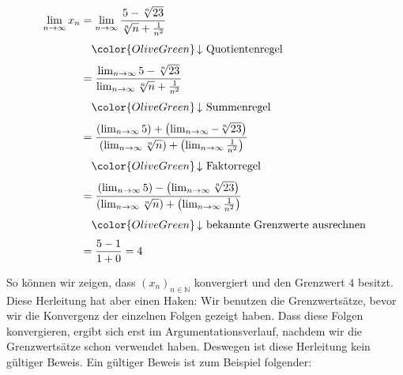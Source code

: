 \documentclass[fontsize=9pt,
               parskip=half-,
               DIV=14,
               listof=chapterentry,
               tocflat]{scrbook}
\begin{document}
\begin{align*}
\lim _{n\rightarrow \infty }x_{n}&=\lim _{n\rightarrow \infty }{\frac {5-{\sqrt[{n}]{23}}}{{\sqrt[{n}]{n}}+{\tfrac {1}{n^{2}}}}}\\[0.3em]&\quad {\color {OliveGreen}\left\downarrow \ {\text{Quotientenregel}}\right.}\\[0.3em]&={\frac {\lim _{n\rightarrow \infty }5-{\sqrt[{n}]{23}}}{\lim _{n\rightarrow \infty }{\sqrt[{n}]{n}}+{\tfrac {1}{n^{2}}}}}\\[0.3em]&\quad {\color {OliveGreen}\left\downarrow \ {\text{Summenregel}}\right.}\\[0.3em]&={\frac {\left(\lim _{n\rightarrow \infty }5\right)+\left(\lim _{n\rightarrow \infty }-{\sqrt[{n}]{23}}\right)}{\left(\lim _{n\rightarrow \infty }{\sqrt[{n}]{n}}\right)+\left(\lim _{n\rightarrow \infty }{\tfrac {1}{n^{2}}}\right)}}\\[0.3em]&\quad {\color {OliveGreen}\left\downarrow \ {\text{Faktorregel}}\right.}\\[0.3em]&={\frac {\left(\lim _{n\rightarrow \infty }5\right)-\left(\lim _{n\rightarrow \infty }{\sqrt[{n}]{23}}\right)}{\left(\lim _{n\rightarrow \infty }{\sqrt[{n}]{n}}\right)+\left(\lim _{n\rightarrow \infty }{\tfrac {1}{n^{2}}}\right)}}\\[0.3em]&\quad {\color {OliveGreen}\left\downarrow \ {\text{bekannte Grenzwerte ausrechnen}}\right.}\\[0.3em]&={\frac {5-1}{1+0}}=4
\end{align*}

So können wir zeigen, dass $(x_{n})_{n\in \mathbb {N} }$ konvergiert und den Grenzwert $4$ besitzt. Diese Herleitung hat aber einen Haken: Wir benutzen die Grenzwertsätze, bevor wir die Konvergenz der einzelnen Folgen gezeigt haben. Dass diese Folgen konvergieren, ergibt sich erst im Argumentationsverlauf, nachdem wir die Grenzwertsätze schon verwendet haben. Deswegen ist diese Herleitung kein gültiger Beweis. Ein gültiger Beweis ist zum Beispiel folgender:
\end{document}
